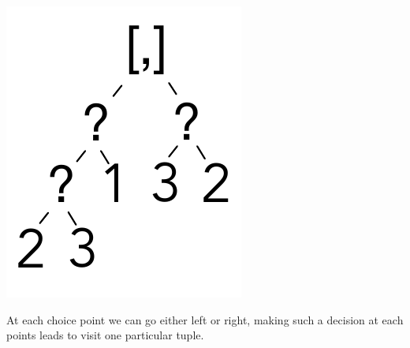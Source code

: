 \documentclass[a4paper,english]{lipics-v2019}
\begin{document}
\includegraphics[scale=.25]{figures/tree1.pdf}

\noindent
At each choice point we can go either left or right, making such a decision
at each points leads to visit one particular tuple.
\end{document}
